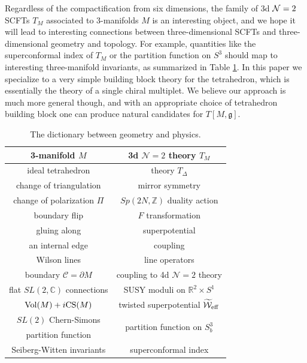 \documentclass[hyper,letterpaper]{JHEP3}
\numberwithin{equation}{section}
\newcommand{\Z}{{\mathbb Z}}
\newcommand{\R}{{\mathbb R}}
\newcommand{\C}{{\mathbb C}}
\newcommand{\CC}{\mathcal{C}}
\newcommand{\CN}{\mathcal{N}}
\newcommand{\CW}{\mathcal{W}}
\begin{document}
Regardless of the compactification from six dimensions,
the family of 3d ${\cal N}=2$ SCFTs $T_M$ associated to 3-manifolds $M$ is an interesting object,
and we hope it will lead to interesting connections between three-dimensional SCFTs and three-dimensional geometry and topology.
For example, quantities like the superconformal index of $T_M$ or the partition function on $S^3$
should map to interesting three-manifold invariants,
as summarized in Table \ref{tab:dict}.
In this paper we specialize to a very simple building block theory for the tetrahedron, which is essentially the theory of a single chiral multiplet.
We believe our approach is much more general though, and with an appropriate choice of tetrahedron building block one can produce natural candidates for $T[M,\mathfrak{g}]$.


\begin{table}[htb]
\centering
\renewcommand{\arraystretch}{1.3}
\begin{tabular}{|@{\quad}c@{\quad}|@{\quad}c@{\quad}| }
\hline  {\bf 3-manifold} $M$ & {\bf 3d} $\CN=2$ {\bf theory} $T_M$
\\
\hline
\hline ideal tetrahedron & theory $T_{\Delta}$ \\
\hline change of triangulation & mirror symmetry \\
\hline change of polarization $\Pi$ & $Sp(2N,\Z)$ duality action \\
\hline boundary flip & $F$ transformation \\
\hline gluing along &  superpotential \\[-.2cm]
 an internal edge & coupling \\
\hline Wilson lines & line operators \\
\hline boundary $\CC = \partial M$ & coupling to 4d $\CN=2$ theory \\
\hline flat $SL(2,\C)$ connections & SUSY moduli on $\R^2 \times S^1$ \\
\hline ${\rm Vol} (M) + i {\rm CS} (M)$ & twisted superpotential $\widetilde{\CW}_{{\rm eff}}$ \\
\hline $SL(2)$ Chern-Simons &  \multirow{2}{*}{partition function on $S^3_b$} \\[-.2cm]
 partition function & \\
\hline Seiberg-Witten invariants & superconformal index \\
\hline
\end{tabular}
\caption{The dictionary between geometry and physics.}
\label{tab:dict}
\end{table}
\end{document}
